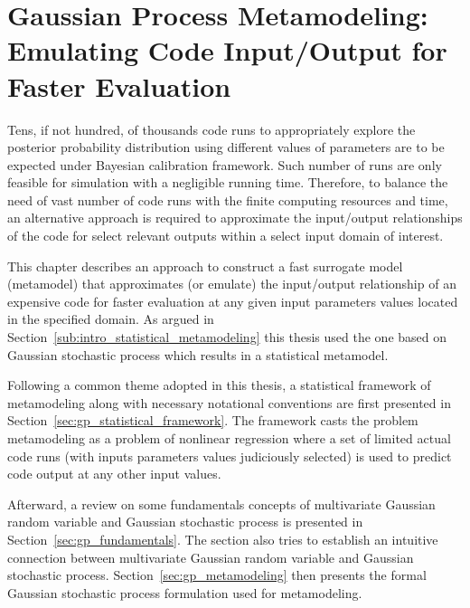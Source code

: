 \chapter[Gaussian Process Metamodeling]{Gaussian Process Metamodeling: Emulating Code Input/Output for Faster Evaluation}\label{ch:gp_metamodel}

Tens, if not hundred, of thousands code runs to appropriately explore the posterior probability distribution using different values of parameters are to be expected under Bayesian calibration framework.
Such number of runs are only feasible for simulation with a negligible running time.
Therefore, to balance the need of vast number of code runs with the finite computing resources and time, 
an alternative approach is required to approximate the input/output relationships of the code for select relevant outputs within a select input domain of interest. 

This chapter describes an approach to construct a fast surrogate model (metamodel) that approximates (or emulate) the input/output relationship of an expensive code for faster evaluation at any given input parameters values located in the specified domain.
As argued in Section~\ref{sub:intro_statistical_metamodeling} this thesis used the one based on Gaussian stochastic process which results in a statistical metamodel. 

Following a common theme adopted in this thesis, a statistical framework of metamodeling along with necessary notational conventions are first presented in Section~\ref{sec:gp_statistical_framework}.
The framework casts the problem metamodeling as a problem of nonlinear regression where a set of limited actual code runs (with inputs parameters values judiciously selected) is used to predict code output at any other input values.

Afterward, a review on some fundamentals concepts of multivariate Gaussian random variable and Gaussian stochastic process is presented in Section~\ref{sec:gp_fundamentals}.
The section also tries to establish an intuitive connection between multivariate Gaussian random variable and Gaussian stochastic process.
Section~\ref{sec:gp_metamodeling} then presents the formal Gaussian stochastic process formulation used for metamodeling.


